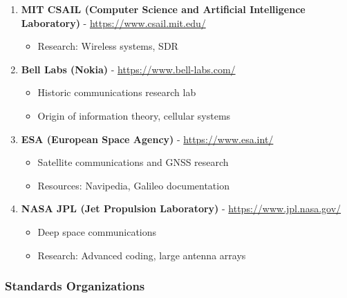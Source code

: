 \begin{enumerate}
\def\labelenumi{\arabic{enumi}.}
\setcounter{enumi}{59}
\tightlist
\item
  \textbf{MIT CSAIL (Computer Science and Artificial Intelligence
  Laboratory)} - \url{https://www.csail.mit.edu/}

  \begin{itemize}
  \tightlist
  \item
    Research: Wireless systems, SDR
  \end{itemize}
\item
  \textbf{Bell Labs (Nokia)} - \url{https://www.bell-labs.com/}

  \begin{itemize}
  \tightlist
  \item
    Historic communications research lab
  \item
    Origin of information theory, cellular systems
  \end{itemize}
\item
  \textbf{ESA (European Space Agency)} - \url{https://www.esa.int/}

  \begin{itemize}
  \tightlist
  \item
    Satellite communications and GNSS research
  \item
    Resources: Navipedia, Galileo documentation
  \end{itemize}
\item
  \textbf{NASA JPL (Jet Propulsion Laboratory)} - \url{https://www.jpl.nasa.gov/}

  \begin{itemize}
  \tightlist
  \item
    Deep space communications
  \item
    Research: Advanced coding, large antenna arrays
  \end{itemize}
\end{enumerate}

\subsubsection{Standards Organizations}\label{standards-organizations}


